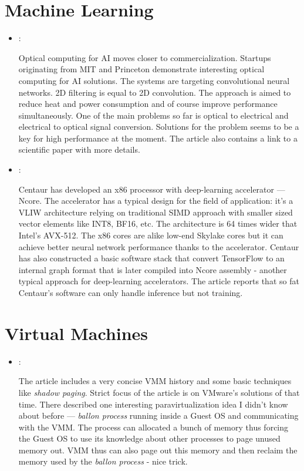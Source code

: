 \section*{Machine Learning}
\begin{itemize}
    \item \cite{Wheeler:Optical-AI:2019}:

    Optical computing for AI moves closer to commercialization. Startups originating from MIT and Princeton demonstrate interesting optical computing for AI solutions. The systems are targeting convolutional neural networks. 2D filtering is equal to 2D convolution. The approach is aimed to reduce heat and power consumption and of course improve performance simultaneously. One of the main problems so far is optical to electrical and electrical to optical signal conversion. Solutions for the problem seems to be a key for high performance at the moment. The article also contains a link to a scientific paper with more details.

    \item \cite{Gwennap:Centaur-AI:2019}:

    Centaur has developed an x86 processor with deep-learning accelerator --- Ncore. The accelerator has a typical design for the field of application: it's a VLIW architecture relying on traditional SIMD approach with smaller sized vector elements like INT8, BF16, etc. The architecture is 64 times wider that Intel's AVX-512. The x86 cores are alike low-end Skylake cores but it can achieve better neural network performance thanks to the accelerator. Centaur has also constructed a basic software stack that convert TensorFlow to an internal graph format that is later compiled into Ncore assembly - another typical approach for deep-learning accelerators. The article reports that so fat Centaur's software can only handle inference but not training.
\end{itemize}

\section*{Virtual Machines}
\begin{itemize}
    \item \cite{Rosenblum:VMM-trends:2005}:

    The article includes a very concise VMM history and some basic techniques like \textit{shadow paging}. Strict focus of the article is on VMware's solutions of that time. There described one interesting paravirtualization idea I didn't know about before --- \textit{ballon process} running inside a Guest OS and communicating with the VMM. The process can allocated a bunch of memory thus forcing the Guest OS to use its knowledge about other processes to page unused memory out. VMM thus can also page out this memory and then reclaim the memory used by the \textit{ballon process} - nice trick.
\end{itemize}


